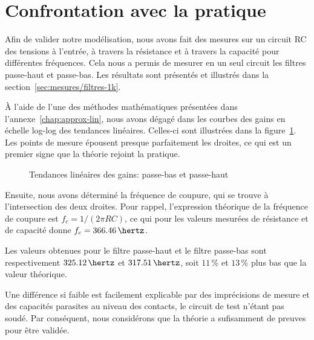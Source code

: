 \section{Confrontation avec la pratique}
\label{sec:filtres/confront}

Afin de valider notre modélisation,
nous avons fait des mesures sur un circuit RC
des tensions à l'entrée, à travers la résistance
et à travers la capacité pour différentes fréquences.
Cela nous a permis de mesurer en un seul circuit
les filtres passe-haut et passe-bas.
Les résultats sont présentés et illustrés
dans la section~\ref{sec:mesures/filtres-1k}.

À l'aide de l'une des méthodes mathématiques présentées dans
l'annexe~\ref{chap:approx-lin},
nous avons dégagé dans les courbes des gains en échelle log-log
des tendances linéaires.
Celles-ci sont illustrées dans la figure~\ref{fig:ph-pb-tendances}.
Les points de mesure épousent presque parfaitement les droites,
ce qui est un premier signe que la théorie rejoint la pratique.

\begin{figure}[h!]
    \centering
    \caption{Tendances linéaires des gains: passe-bas et passe-haut}
    \label{fig:ph-pb-tendances}
\end{figure}

Ensuite, nous avons déterminé la fréquence de coupure,
qui se trouve à l'intersection des deux droites.
Pour rappel, l'expression théorique de la fréquence de coupure est
$f_c=1/(2\pi RC)$, ce qui pour les valeurs mesurées de résistance et
de capacité donne $f_c=366.46\,\hertz$.

Les valeurs obtenues pour le filtre passe-haut et le filtre passe-bas
sont respectivement $325.12\,\hertz$ et $317.51\,\hertz$,
soit $11\,\%$ et $13\,\%$ plus bas que la valeur théorique.

Une différence si faible est facilement explicable par des imprécisions
de mesure et des capacités parasites au niveau des contacts,
le circuit de test n'étant pas soudé.
Par conséquent, nous considérons que la théorie a sufisamment de preuves
pour être validée.
